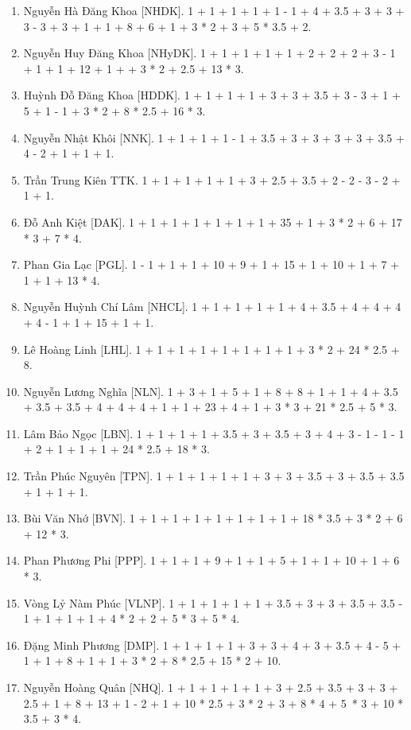 \documentclass{article}
\begin{document}
\begin{enumerate}
	\item {\sc Nguyễn Hà Đăng Khoa [NHDK].} 1 + 1 + 1 + 1 + 1 - 1 + 4 + 3.5 + 3 + 3 + 3 - 3 + 3 + 1 + 1 + 8 + 6 + 1 + 3 * 2 + 3 + 5 * 3.5 + 2.
	\item {\sc Nguyễn Huy Đăng Khoa [NHyDK].} 1 + 1 + 1 + 1 + 1 + 2 + 2 + 2 + 3 - 1 + 1 + 1 + 12 + 1 +  + 3 * 2 + 2.5 + 13 * 3.
	\item {\sc Huỳnh Đỗ Đăng Khoa [HDDK].} 1 + 1 + 1 + 1 + 3 + 3 + 3.5 + 3 - 3 + 1 + 5 + 1 - 1 + 3 * 2 + 8 * 2.5 + 16 * 3.
	\item {\sc Nguyễn Nhật Khôi [NNK].} 1 + 1 + 1 + 1 - 1 + 3.5 + 3 + 3 + 3 + 3 + 3.5 + 4 - 2 + 1 + 1 + 1.
	\item {\sc Trần Trung Kiên {TTK}.} 1 + 1 + 1 + 1 + 1 + 3 + 2.5 + 3.5 + 2 - 2 - 3 - 2 + 1 + 1.
	\item {\sc Đỗ Anh Kiệt [DAK].} 1 + 1 + 1 + 1 + 1 + 1 + 1 + 35 + 1 + 3 * 2 + 6 + 17 * 3 + 7 * 4.
	\item {\sc Phan Gia Lạc [PGL].} 1 - 1 + 1 + 1 + 10 + 9 + 1 + 15 + 1 + 10 + 1 + 7 + 1 + 1 + 13 * 4.
	\item {\sc Nguyễn Huỳnh Chí Lâm [NHCL].} 1 + 1 + 1 + 1 + 1 + 4 + 3.5 + 4 + 4 + 4 + 4 - 1 + 1 + 15 + 1 + 1.
	\item {\sc Lê Hoàng Linh [LHL].} 1 + 1 + 1 + 1 + 1 + 1 + 1 + 1 + 3 * 2 + 24 * 2.5 + 8.
	\item {\sc Nguyễn Lương Nghĩa [NLN].} 1 + 3 + 1 + 5 + 1 + 8 + 8 + 1 + 1 + 4 + 3.5 + 3.5 + 3.5 + 4 + 4 + 4 + 1 + 1 + 23 + 4 + 1 + 3 * 3 + 21 * 2.5 + 5 * 3.
	\item {\sc Lâm Bảo Ngọc [LBN].} 1 + 1 + 1 + 1 + 3.5 + 3 + 3.5 + 3 + 4 + 3 - 1 - 1 - 1 + 2 + 1 + 1 + 1 + 24 * 2.5 + 18 * 3.
	\item {\sc Trần Phúc Nguyên [TPN].} 1 + 1 + 1 + 1 + 1 + 3 + 3 + 3.5 + 3 + 3.5 + 3.5 + 1 + 1 + 1.
	\item {\sc Bùi Văn Nhớ [BVN].} 1 + 1 + 1 + 1 + 1 + 1 + 1 + 1 + 18 * 3.5 + 3 * 2 + 6 + 12 * 3.
	\item {\sc Phan Phương Phi [PPP].} 1 + 1 + 1 + 9 + 1 + 1 + 5 + 1 + 1 + 10 + 1 + 6 * 3.
	\item {\sc Vòng Lỷ Nàm Phúc [VLNP].} 1 + 1 + 1 + 1 + 1 + 3.5 + 3 + 3 + 3.5 + 3.5 - 1 + 1 + 1 + 1 + 4 * 2 + 2 + 5 * 3 + 5 * 4.
	\item {\sc Đặng Minh Phương [DMP].} 1 + 1 + 1 + 1 + 3 + 3 + 4 + 3 + 3.5 + 4 - 5 + 1 + 1 + 8 + 1 + 1 + 3 * 2 + 8 * 2.5 + 15 * 2 + 10.
	\item {\sc Nguyễn Hoàng Quân [NHQ].} 1 + 1 + 1 + 1 + 1 + 3 + 2.5 + 3.5 + 3 + 3 + 2.5 + 1 + 8 + 13 + 1 - 2 + 1 + 10 * 2.5 + 3 * 2 + 3 + 8 * 4 + 5 * 3 + 10 * 3.5 + 3 * 4.

\end{enumerate}
\end{document}
